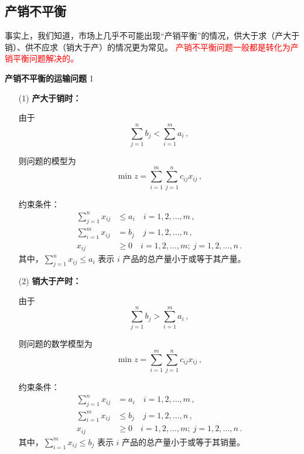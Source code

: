 \subsection{产销不平衡}
事实上，我们知道，市场上几乎不可能出现“产销平衡”的情况，供大于求（产大于销）、供不应求（销大于产）的情况更为常见。
\textcolor{red}{产销不平衡问题一般都是转化为产销平衡问题解决的。}
\begin{exbox}{\textbf{产销不平衡的运输问题}}
    1
    \begin{enumerate}
        \item[(1)] \textbf{产大于销时：}
        
        由于
        \begin{equation}
            \sum_{j=1}^{n} b_j < \sum_{i=1}^{m} a_i \,,
        \end{equation}
        
        则问题的模型为
        \begin{equation}
            \min z = \sum_{i=1}^{m} \sum_{j=1}^{n} c_{ij} x_{ij} \,,
        \end{equation}
        
        约束条件：
        \begin{align}
            \sum_{j=1}^{n} x_{ij} &\leq a_i \quad i=1,2,\dots,m \,, \\
            \sum_{i=1}^{m} x_{ij} &= b_j \quad j=1,2,\dots,n \,, \\
            x_{ij} &\geq 0 \quad i=1,2,\dots,m;\ j=1,2,\dots,n \,.
        \end{align}
        其中，$\sum_{j=1}^{n} x_{ij} \leq a_i$ 表示 $i$ 产品的总产量小于或等于其产量。
        \\
        \item[(2)] \textbf{销大于产时：}
        
        由于
        \begin{equation}
            \sum_{j=1}^{n} b_j > \sum_{i=1}^{m} a_i \,,
        \end{equation}
        
        则问题的数学模型为
        \begin{equation}
            \min z = \sum_{i=1}^{m} \sum_{j=1}^{n} c_{ij} x_{ij} \,,
        \end{equation}
        
        约束条件：
        \begin{align}
            \sum_{j=1}^{n} x_{ij} &= a_i \quad i=1,2,\dots,m \,, \\
            \sum_{i=1}^{m} x_{ij} &\leq b_j \quad j=1,2,\dots,n \,, \\
            x_{ij} &\geq 0 \quad i=1,2,\dots,m;\ j=1,2,\dots,n \,.
        \end{align}
        其中，$\sum_{i=1}^{m} x_{ij} \leq b_j$ 表示 $i$ 产品的总产量小于或等于其销量。
    \end{enumerate}
    

\end{exbox}
